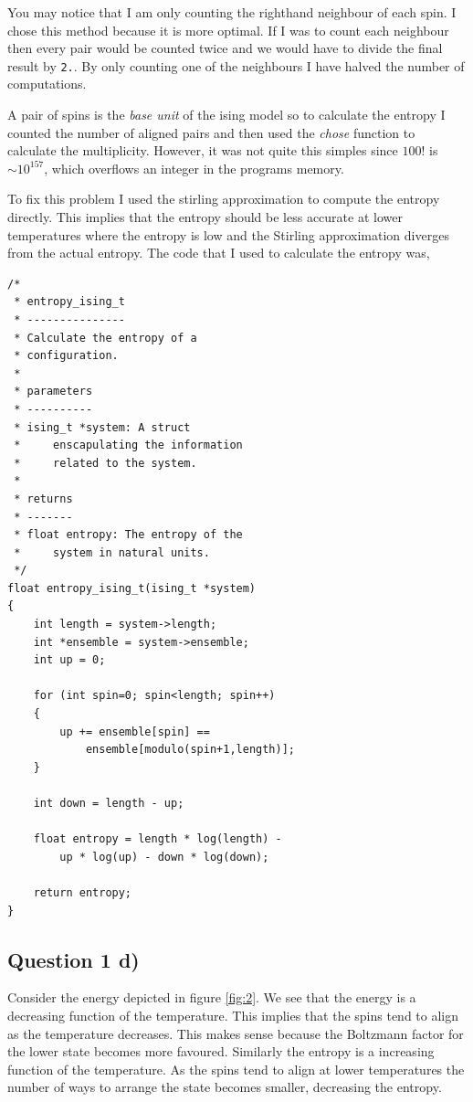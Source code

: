 \documentclass[a4paper, twocolumn]{article}
\begin{document}
You may notice that I am only counting the righthand neighbour %
of each spin. I chose this method because it is more optimal. %
If I was to count each neighbour then every pair would be %
counted twice and we would have to divide the final result by %
\verb!2.!. By only counting one of the neighbours I have %
halved the number of computations. 


A pair of spins is the \emph{base unit} of the ising model %
so to calculate the entropy I counted the number of aligned %
pairs and then used the \emph{chose} function to calculate %
the multiplicity. However, it was not quite this simples %
since \(100!\) is \(\sim 10^{157}\), which overflows an %
integer in the programs memory. 


To fix this problem I used the stirling approximation to %
compute the entropy directly. This implies that the %
entropy should be less accurate at lower temperatures %
where the entropy is low and the Stirling approximation %
diverges from the actual entropy. The code that I used %
to calculate the entropy was,

\begin{lstlisting}
/*
 * entropy_ising_t
 * ---------------
 * Calculate the entropy of a 
 * configuration. 
 *
 * parameters
 * ----------
 * ising_t *system: A struct 
 *     enscapulating the information 
 *     related to the system. 
 *
 * returns
 * -------
 * float entropy: The entropy of the
 *     system in natural units. 
 */
float entropy_ising_t(ising_t *system)
{ 
    int length = system->length;
    int *ensemble = system->ensemble; 
    int up = 0;

    for (int spin=0; spin<length; spin++)
    {
        up += ensemble[spin] == 
            ensemble[modulo(spin+1,length)];
    }

    int down = length - up;

    float entropy = length * log(length) - 
        up * log(up) - down * log(down);
    
    return entropy;   
}
\end{lstlisting}





\subsection*{Question 1 d)}
Consider the energy depicted in figure \ref{fig:2}. We see that %
the energy is a decreasing function of the temperature. This %
implies that the spins tend to align as the temperature decreases. %
This makes sense because the Boltzmann factor for the lower state %
becomes more favoured. Similarly the entropy is a increasing %
function of the temperature. As the spins tend to align at lower %
temperatures the number of ways to arrange the state becomes %
smaller, decreasing the entropy. 
\end{document}
